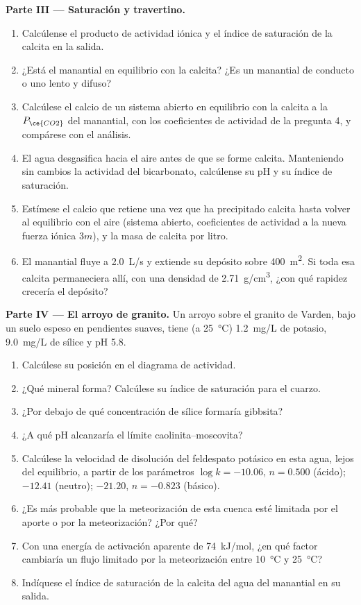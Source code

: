 \begin{problem}
\medskip\noindent\textbf{Parte III --- Saturación y travertino.}
\begin{enumerate}[resume]
\item Calcúlense el producto de actividad iónica y el índice de saturación de la calcita
  en la salida.
\item ¿Está el manantial en equilibrio con la calcita? ¿Es un manantial de conducto o
  uno lento y difuso?
\item Calcúlese el calcio de un sistema abierto en equilibrio con la calcita a
  la $P_{\ce{CO2}}$ del manantial, con los coeficientes de actividad de la pregunta 4,
  y compárese con el análisis.
\item El agua desgasifica hacia el aire antes de que se forme calcita. Manteniendo
  sin cambios la actividad del bicarbonato, calcúlense su pH y su índice de saturación.
\item Estímese el calcio que retiene una vez que ha precipitado calcita hasta
  volver al equilibrio con el aire (sistema abierto, coeficientes de actividad a la nueva
  fuerza iónica $3m$), y la masa de calcita por litro.
\item El manantial fluye a \qty{2.0}{L/s} y extiende su depósito sobre
  \qty{400}{m^2}. Si toda esa calcita permaneciera allí, con una densidad de
  \qty{2.71}{g/cm^3}, ¿con qué rapidez crecería el depósito?
\end{enumerate}

\medskip\noindent\textbf{Parte IV --- El arroyo de granito.} Un arroyo sobre el
granito de Varden, bajo un suelo espeso en pendientes suaves, tiene (a
\qty{25}{\celsius}) \qty{1.2}{mg/L} de potasio, \qty{9.0}{mg/L} de
sílice y pH 5.8.
\begin{enumerate}[resume]
\item Calcúlese su posición en el diagrama de actividad.
\item ¿Qué mineral forma? Calcúlese su índice de saturación para el cuarzo.
\item ¿Por debajo de qué concentración de sílice formaría gibbsita?
\item ¿A qué pH alcanzaría el límite caolinita--moscovita?
\item Calcúlese la velocidad de disolución del feldespato potásico en esta agua, lejos del
  equilibrio, a partir de los parámetros $\log k = -10.06$, $n = 0.500$ (ácido);
  $-12.41$ (neutro); $-21.20$, $n = -0.823$ (básico).
\item ¿Es más probable que la meteorización de esta cuenca esté limitada por el aporte o
  por la meteorización? ¿Por qué?
\item Con una energía de activación aparente de \qty{74}{kJ/mol}, ¿en qué factor
  cambiaría un flujo limitado por la meteorización entre \qty{10}{\celsius} y
  \qty{25}{\celsius}?
\item Indíquese el índice de saturación de la calcita del agua del manantial en su
  salida.
\end{enumerate}
\end{problem}
